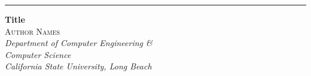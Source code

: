 \begin{titlepage} %
	
	\raggedleft %
	
	\rule{1pt}{\textheight} %
	\hspace{0.05\textwidth} %
	\parbox[b]{0.7\textwidth}{ %
		
		{\Huge\bfseries Title}\\[4\baselineskip] %
		{\Large\textsc{Author Names }} %
            \\[4\baselineskip] 
		{\large\textit{
            Department of Computer Engineering \& \\ Computer Science \\
            California State University, Long Beach}}
		
		\vspace{0.5\textheight} %
		
		{\noindent ~~\plogo}\\[\baselineskip] %
	}

\end{titlepage}


